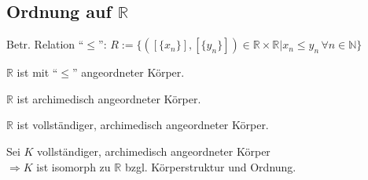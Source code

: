 \subsection{Ordnung auf \texorpdfstring{$\mathbb{R}$}{R}}
\begin{*definition}
	Betr. Relation "`$\le$"': $R:=\{ ([\{x_n\}],[\{y_n\}])\in\mathbb{R}\times\mathbb{R} | x_n \le y_n\,\forall n\in\mathbb{N}\}$
\end{*definition}
\begin{proposition}
	$\mathbb{R}$ ist mit "`$\le$"' angeordneter Körper.
\end{proposition}
\begin{proposition}
	$\mathbb{R}$ ist archimedisch angeordneter Körper.
\end{proposition}
\begin{theorem}
	$\mathbb{R}$ ist vollständiger, archimedisch angeordneter Körper.
\end{theorem}
\begin{theorem}
	Sei $K$ vollständiger, archimedisch angeordneter Körper\\
	$\Rightarrow K$ ist isomorph zu $\mathbb{R}$ bzgl. Körperstruktur und Ordnung.
\end{theorem}

